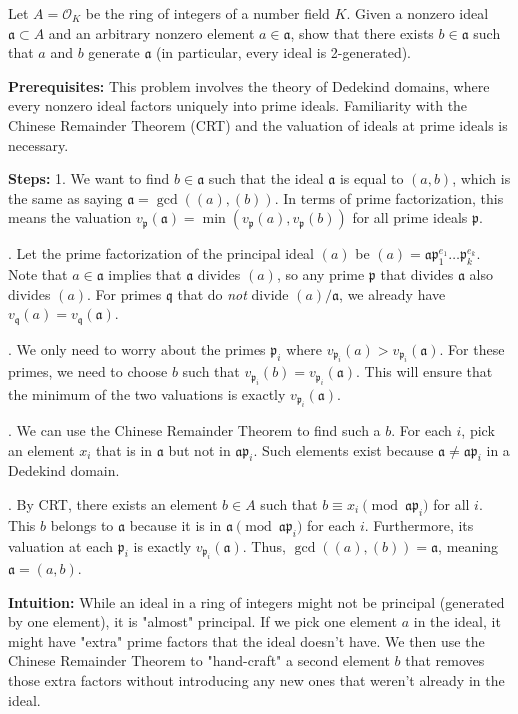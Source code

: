 \begin{exercise}
\label{algebra:2022:4}
Let $A = \mathcal{O}_K$ be the ring of integers of a number field $K$. Given a nonzero ideal $\mathfrak{a} \subset A$ and an arbitrary nonzero element $a \in \mathfrak{a}$, show that there exists $b \in \mathfrak{a}$ such that $a$ and $b$ generate $\mathfrak{a}$ (in particular, every ideal is 2-generated).
\end{exercise}

\begin{solution}
\textbf{Prerequisites:}
This problem involves the theory of Dedekind domains, where every nonzero ideal factors uniquely into prime ideals. Familiarity with the Chinese Remainder Theorem (CRT) and the valuation of ideals at prime ideals is necessary.

\medskip
\textbf{Steps:}
1. We want to find $b \in \mathfrak{a}$ such that the ideal $\mathfrak{a}$ is equal to $(a, b)$, which is the same as saying $\mathfrak{a} = \gcd((a), (b))$. In terms of prime factorization, this means the valuation $v_{\mathfrak{p}}(\mathfrak{a}) = \min(v_{\mathfrak{p}}(a), v_{\mathfrak{p}}(b))$ for all prime ideals $\mathfrak{p}$.

. Let the prime factorization of the principal ideal $(a)$ be $(a) = \mathfrak{a} \mathfrak{p}_1^{e_1} \dots \mathfrak{p}_k^{e_k}$. Note that $a \in \mathfrak{a}$ implies that $\mathfrak{a}$ divides $(a)$, so any prime $\mathfrak{p}$ that divides $\mathfrak{a}$ also divides $(a)$. For primes $\mathfrak{q}$ that do \textit{not} divide $(a)/\mathfrak{a}$, we already have $v_{\mathfrak{q}}(a) = v_{\mathfrak{q}}(\mathfrak{a})$.

. We only need to worry about the primes $\mathfrak{p}_i$ where $v_{\mathfrak{p}_i}(a) > v_{\mathfrak{p}_i}(\mathfrak{a})$. For these primes, we need to choose $b$ such that $v_{\mathfrak{p}_i}(b) = v_{\mathfrak{p}_i}(\mathfrak{a})$. This will ensure that the minimum of the two valuations is exactly $v_{\mathfrak{p}_i}(\mathfrak{a})$.

. We can use the Chinese Remainder Theorem to find such a $b$. For each $i$, pick an element $x_i$ that is in $\mathfrak{a}$ but not in $\mathfrak{a}\mathfrak{p}_i$. Such elements exist because $\mathfrak{a} \neq \mathfrak{a}\mathfrak{p}_i$ in a Dedekind domain.

. By CRT, there exists an element $b \in A$ such that $b \equiv x_i \pmod{\mathfrak{a}\mathfrak{p}_i}$ for all $i$. This $b$ belongs to $\mathfrak{a}$ because it is in $\mathfrak{a} \pmod{\mathfrak{a}\mathfrak{p}_i}$ for each $i$. Furthermore, its valuation at each $\mathfrak{p}_i$ is exactly $v_{\mathfrak{p}_i}(\mathfrak{a})$. Thus, $\gcd((a), (b)) = \mathfrak{a}$, meaning $\mathfrak{a} = (a, b)$.

\medskip
\textbf{Intuition:}
While an ideal in a ring of integers might not be principal (generated by one element), it is "almost" principal. If we pick one element $a$ in the ideal, it might have "extra" prime factors that the ideal doesn't have. We then use the Chinese Remainder Theorem to "hand-craft" a second element $b$ that removes those extra factors without introducing any new ones that weren't already in the ideal.
\end{solution}

